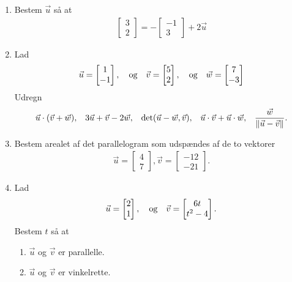 \begin{enumerate}
	\item Bestem $\vec{u}$ så at 
	\begin{align*}
	\begin{bmatrix}
	3\\2
	\end{bmatrix}=-\begin{bmatrix}
	-1\\3
	\end{bmatrix}+2\vec{u}
	\end{align*}
	
	\item Lad 
	\begin{align*}
	\vec{u}=\begin{bmatrix}
	1\\-1
	\end{bmatrix},\quad \textup{og}\quad \vec{v}=\begin{bmatrix}
	5\\2
	\end{bmatrix},\quad \textup{og}\quad
	\vec{w}=\begin{bmatrix}
	7\\-3
	\end{bmatrix}
	\end{align*}
	Udregn
	\begin{align*}
	\vec{u}\cdot(\vec{v}+\vec{w}),&&3\vec{u}+\vec{v}-2\vec{w},&&\det(\vec{u}-\vec{w},\vec{v}),&&\vec{u}\cdot \vec{v}+\vec{u}\cdot \vec{w},&&\frac{\vec{w}}{\Vert \vec{u}-\vec{v}\Vert}.
	\end{align*}
	
	\item Bestem arealet af det parallelogram som udspændes af de to vektorer
	\begin{align*}
	\vec{u}=\begin{bmatrix}
	4\\7
	\end{bmatrix},
	\vec{v}=\begin{bmatrix}
	-12\\-21
	\end{bmatrix}.
	\end{align*}
	
	
	\item Lad
	\begin{align*}
	\vec{u}=\begin{bmatrix}
	2\\1
	\end{bmatrix},\quad \textup{og}\quad \vec{v}=\begin{bmatrix}
	6t\\t^2-4
	\end{bmatrix}.
	\end{align*}
	Bestem $t$ så at
	\begin{enumerate}
		\item $\vec{u}$ og $\vec{v}$ er parallelle.
		\item $\vec{u}$ og $\vec{v}$ er vinkelrette.
	\end{enumerate}
	

\end{enumerate}

